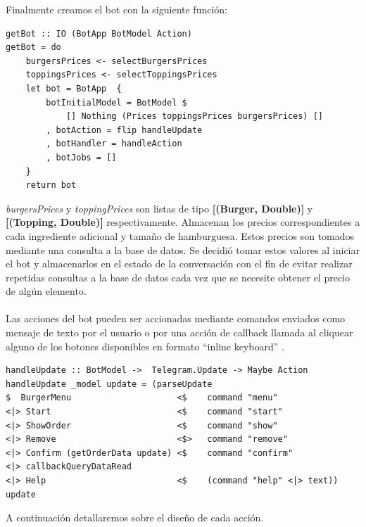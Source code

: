\documentclass[a4paper,12pt]{article}
\begin{document}
Finalmente creamos el bot con la siguiente función:

\begin{verbatim}
getBot :: IO (BotApp BotModel Action)
getBot = do
	burgersPrices <- selectBurgersPrices
	toppingsPrices <- selectToppingsPrices
	let bot = BotApp  { 
		botInitialModel = BotModel $ 
			[] Nothing (Prices toppingsPrices burgersPrices) []
		, botAction = flip handleUpdate
		, botHandler = handleAction
		, botJobs = []  
	}
	return bot       
\end{verbatim}

\textit{burgersPrices} y \textit{toppingPrices} son listas de tipo  \textbf{[(Burger, Double)]} y \textbf{[(Topping, Double)]} respectivamente. Almacenan los precios correspondientes a cada ingrediente adicional y tamaño de hamburguesa. Estos precios son tomados mediante una consulta a la base de datos. Se decidió tomar estos valores al iniciar el bot y almacenarlos  en el estado de la conversación con el fin de evitar realizar repetidas consultas a la base de datos cada vez que se necesite obtener el precio de algún elemento.
\\\\
Las acciones del bot pueden ser accionadas mediante comandos enviados como mensaje de texto por el usuario o por una acción de callback llamada al cliquear alguno de los botones disponibles en formato “inline keyboard” .

\begin{verbatim}
handleUpdate :: BotModel ->  Telegram.Update -> Maybe Action
handleUpdate _model update = (parseUpdate
$  BurgerMenu                     <$    command "menu" 
<|> Start                         <$    command "start" 
<|> ShowOrder                     <$    command "show" 
<|> Remove                        <$>   command "remove"
<|> Confirm (getOrderData update) <$    command "confirm"
<|> callbackQueryDataRead
<|> Help                          <$    (command "help" <|> text)) update
\end{verbatim}

\pagebreak

A continuación detallaremos sobre el diseño de cada acción.
\end{document}
